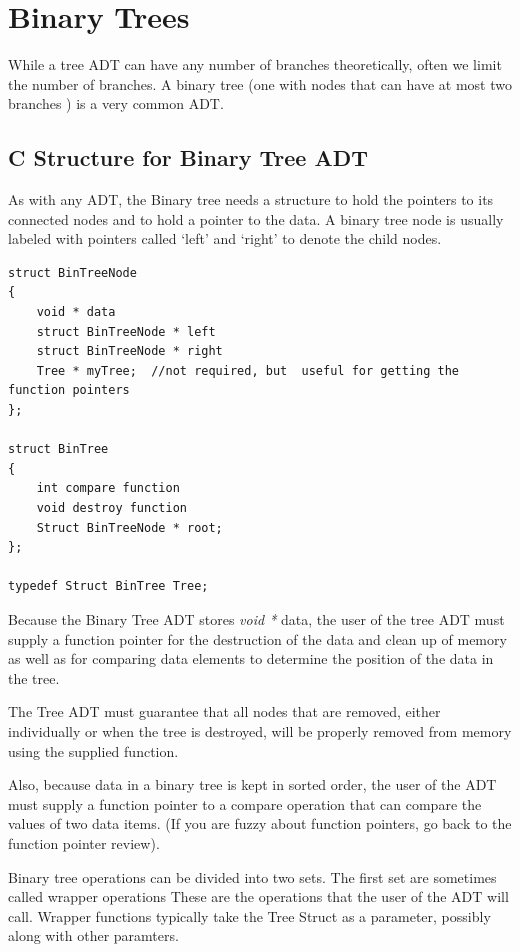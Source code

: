 \section{Binary Trees}

While a tree ADT can have any number of branches theoretically, often we
limit the number of branches. A binary tree (one with nodes that can
have at most two branches ) is a very common ADT. 

\subsection {C Structure for Binary Tree ADT}

As with any ADT, the Binary tree needs a structure to hold the pointers
to its connected nodes and to hold a pointer to the data. A binary tree
node is usually labeled with pointers called `left' and `right' to
denote the child nodes.

\begin{lstlisting}
struct BinTreeNode
{
	void * data
	struct BinTreeNode * left
	struct BinTreeNode * right
	Tree * myTree;  //not required, but  useful for getting the function pointers
};

struct BinTree
{
	int compare function
	void destroy function
	Struct BinTreeNode * root;
};

typedef Struct BinTree Tree;
\end{lstlisting}

Because the Binary Tree ADT stores \emph{void * } data,  the user of the tree ADT must supply a function pointer for
the destruction of the data and clean up of memory as well as for comparing data elements to determine the position of the data in the tree.

  The Tree ADT
must guarantee that all nodes that are removed, either individually
or when the tree is destroyed, will be properly removed from memory
using the supplied function. 

Also, because data in a binary tree is kept
in sorted order, the user of the ADT must supply a function pointer to a
compare operation that can compare the values of two data items. (If you
are fuzzy about function pointers, go back to the function pointer
review).

Binary tree operations can be divided into two sets. The first set are
sometimes called wrapper operations  These are the operations that the
user of the ADT will call.  Wrapper functions typically take the Tree Struct as a parameter, possibly along with other paramters.

